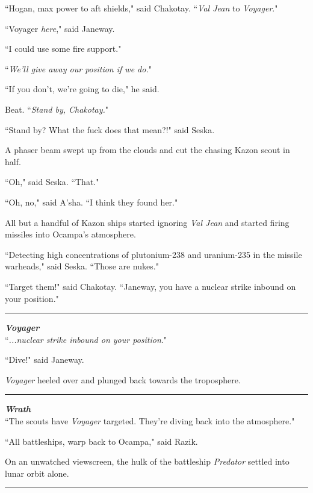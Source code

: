 \documentclass[twoside,letterpaper,12pt]{memoir}
\begin{document}
``Hogan, max power to aft shields," said Chakotay. ``\textit{Val Jean} to \textit{Voyager}."

``Voyager \textit{here}," said Janeway.

``I could use some fire support."

``\textit{We'll give away our position if we do.}"

``If you don't, we're going to die," he said.

Beat. ``\textit{Stand by, Chakotay.}"

``Stand by? What the fuck does that mean?!" said Seska.

A phaser beam swept up from the clouds and cut the chasing Kazon scout in half.

``Oh," said Seska. ``That."

``Oh, no," said A'sha. ``I think they found her."

All but a handful of Kazon ships started ignoring \textit{Val Jean} and started firing missiles into Ocampa's atmosphere.

``Detecting high concentrations of plutonium-238 and uranium-235 in the missile warheads," said Seska. ``Those are nukes."

``Target them!" said Chakotay. ``Janeway, you have a nuclear strike inbound on your position."

\begin{center}\rule{3cm}{0.4 pt}\end{center}

\noindent\textit{\textbf{Voyager}}\\

``\textit{...nuclear strike inbound on your position}."

``Dive!" said Janeway.

\textit{Voyager} heeled over and plunged back towards the troposphere.

\begin{center}\rule{3cm}{0.4 pt}\end{center}

\noindent\textit{\textbf{Wrath}}\\

``The scouts have \textit{Voyager} targeted. They're diving back into the atmosphere."

``All battleships, warp back to Ocampa," said Razik.

On an unwatched viewscreen, the hulk of the battleship \textit{Predator} settled into lunar orbit alone.

\begin{center}\rule{3cm}{0.4 pt}\end{center}
\end{document}
